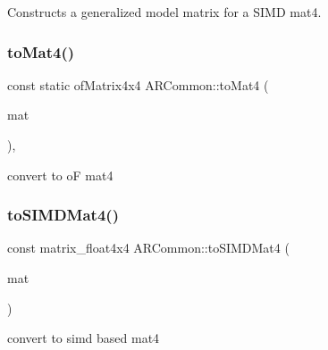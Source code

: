 Constructs a generalized model matrix for a S\+I\+MD mat4. 

\mbox{\label{namespace_a_r_common_a78fc93a50ebb387050bae7d69d2a8cce}} 
\subsubsection{\texorpdfstring{to\+Mat4()}{toMat4()}}
{\footnotesize\ttfamily const static of\+Matrix4x4 A\+R\+Common\+::to\+Mat4 (\begin{DoxyParamCaption}\item[{const matrix\+\_\+float4x4 \&}]{mat }\end{DoxyParamCaption})\hspace{0.3cm}{\ttfamily [inline]}, {\ttfamily [static]}}



convert to oF mat4 

\mbox{\label{namespace_a_r_common_ad6930ed2b61bca10da347b8bb398d3b8}} 
\subsubsection{\texorpdfstring{to\+S\+I\+M\+D\+Mat4()}{toSIMDMat4()}}
{\footnotesize\ttfamily const matrix\+\_\+float4x4 A\+R\+Common\+::to\+S\+I\+M\+D\+Mat4 (\begin{DoxyParamCaption}\item[{of\+Matrix4x4 \&}]{mat }\end{DoxyParamCaption})}



convert to simd based mat4 

